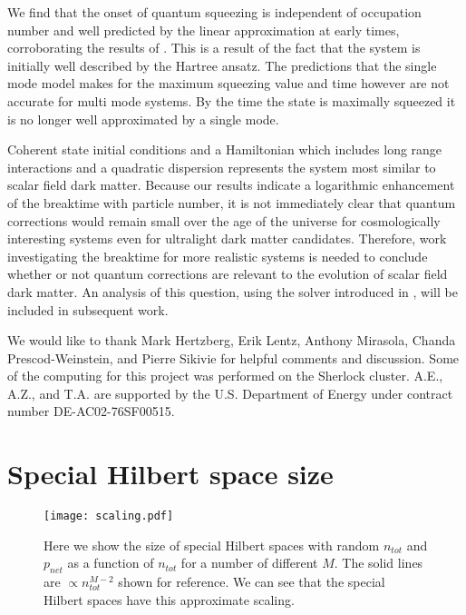 \documentclass[aps,prd,twocolumn,superscriptaddress]{revtex4-1}
\begin{document}
We find that the onset of quantum squeezing is independent of occupation number and well predicted by the linear approximation at early times, corroborating the results of \cite{KoppFragkosPikovski2021}. This is a result of the fact that the system is initially well described by the Hartree ansatz. The predictions that the single mode model makes for the maximum squeezing value and time however are not accurate for multi mode systems. By the time the state is maximally squeezed it is no longer well approximated by a single mode. 

Coherent state initial conditions and a Hamiltonian which includes long range interactions and a quadratic dispersion represents the system most similar to scalar field dark matter. Because our results indicate a logarithmic enhancement of the breaktime with particle number, it is not immediately clear that quantum corrections would remain small over the age of the universe for cosmologically interesting systems even for ultralight dark matter candidates. Therefore, work investigating the breaktime for more realistic systems is needed to conclude whether or not quantum corrections are relevant to the evolution of scalar field dark matter. An analysis of this question, using the solver introduced in \cite{Eberhardt2021}, will be included in subsequent work. 

\begin{acknowledgments} 
We would like to thank Mark Hertzberg, Erik Lentz, Anthony Mirasola, Chanda Prescod-Weinstein, and Pierre Sikivie for helpful comments and discussion. Some of the computing for this project was performed on the Sherlock cluster. A.E., A.Z., and T.A. are supported by the U.S. Department of Energy under contract number DE-AC02-76SF00515. 
\end{acknowledgments}

\appendix*

\section{Special Hilbert space size} \label{app:spHS}

\begin{figure}
	\texttt{[image: scaling.pdf]}
	\caption{ Here we show the size of special Hilbert spaces with random $n_{tot}$ and $p_{net}$ as a function of $n_{tot}$ for a number of different $M$. The solid lines are $\propto n_{tot}^{M-2}$ shown for reference. We can see that the special Hilbert spaces have this approximate scaling. }
	\label{fig:scaling}
\end{figure}
\end{document}
